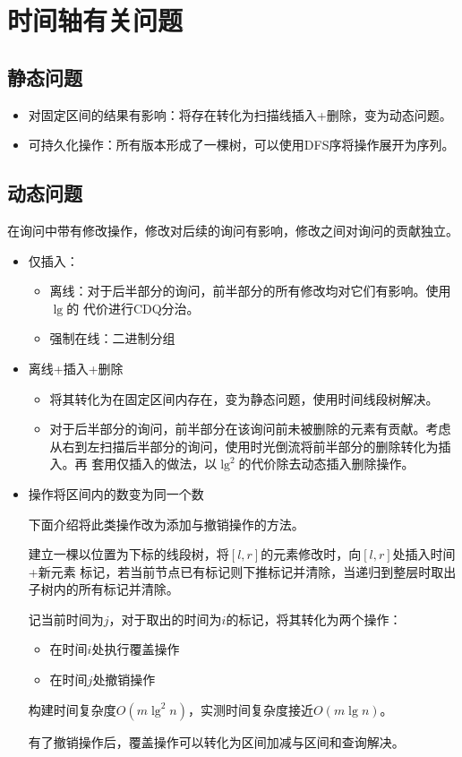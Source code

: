 \section{时间轴有关问题}
\subsection{静态问题}
\begin{itemize}
    \item 对固定区间的结果有影响：将存在转化为扫描线插入+删除，变为动态问题。
    \item 可持久化操作：所有版本形成了一棵树，可以使用DFS序将操作展开为序列。
\end{itemize}
\subsection{动态问题}
在询问中带有修改操作，修改对后续的询问有影响，修改之间对询问的贡献独立。

\begin{itemize}
    \item 仅插入：
    \begin{itemize}
        \item 离线：对于后半部分的询问，前半部分的所有修改均对它们有影响。使用$\lg$的
        代价进行CDQ分治。
        \item 强制在线：二进制分组
    \end{itemize}
    \item 离线+插入+删除
    \begin{itemize}
        \item 将其转化为在固定区间内存在，变为静态问题，使用时间线段树解决。
        \item 对于后半部分的询问，前半部分在该询问前未被删除的元素有贡献。考虑
        从右到左扫描后半部分的询问，使用时光倒流将前半部分的删除转化为插入。再
        套用仅插入的做法，以$\lg^2$的代价除去动态插入删除操作。
    \end{itemize}
    \item 操作将区间内的数变为同一个数

    下面介绍将此类操作改为添加与撤销操作的方法。

    建立一棵以位置为下标的线段树，将$[l,r]$的元素修改时，向$[l,r]$处插入时间+新元素
    标记，若当前节点已有标记则下推标记并清除，当递归到整层时取出子树内的所有标记并清除。

    记当前时间为$j$，对于取出的时间为$i$的标记，将其转化为两个操作：
    \begin{itemize}
        \item 在时间$i$处执行覆盖操作
        \item 在时间$j$处撤销操作
    \end{itemize}

    构建时间复杂度$O(m\lg^2 n)$，实测时间复杂度接近$O(m\lg n)$。

    有了撤销操作后，覆盖操作可以转化为区间加减与区间和查询解决。
\end{itemize}
